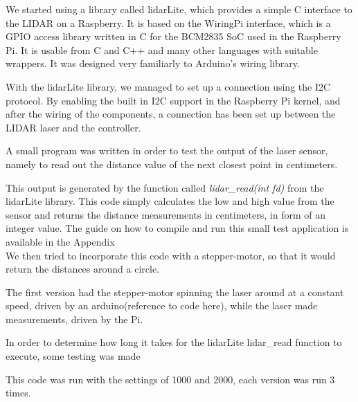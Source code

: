 We started using a library called lidarLite, which provides a simple C interface to the LIDAR on a Raspberry. It is based on the WiringPi interface, which is a GPIO access library written in C for the BCM2835 SoC used in the Raspberry Pi. It is usable from C and C++ and many other languages with suitable wrappers. It was designed very familiarly to Arduino's wiring library.

With the lidarLite library, we managed to set up a connection using the I2C protocol. By enabling the built in I2C support in the Raspberry Pi kernel, and after the wiring of the components, a connection has been set up between the LIDAR laser and the controller.




A small program was written in order to test the output of the laser sensor, namely to read out the distance value of the next closest point in centimeters. 


This output is generated by the function called \textit{lidar\_read(int fd)} from the lidarLite library. This code simply calculates the low and high value from the sensor and returns the distance measurements in centimeters, in form of an integer value. The guide on how to compile and run this small test application is available in the Appendix \\ 



We then tried to incorporate this code with a stepper-motor, so that it would return the distances around a circle.

The first version had the stepper-motor spinning the laser around at a constant speed, driven by an arduino(reference to code here), while the laser made measurements, driven by the Pi.

In order to determine how long it takes for the lidarLite lidar\_read function to execute, some testing was made


This code was run with the settings of 1000 and 2000, each version was run 3 times.

